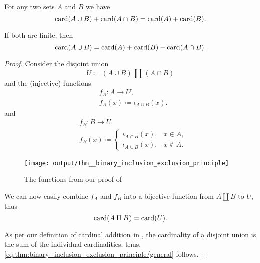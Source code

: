 \begin{theorem}\label{thm:binary_inclusion_exclusion_principle}
  For any two sets \( A \) and \( B \) we have
  \begin{equation}\label{eq:thm:binary_inclusion_exclusion_principle/general}
    \operatorname{card}(A \cup B) + \operatorname{card}(A \cap B) = \operatorname{card}(A) + \operatorname{card}(B).
  \end{equation}

  If both are finite, then
  \begin{equation}\label{eq:thm:binary_inclusion_exclusion_principle/finite}
    \operatorname{card}(A \cup B) = \operatorname{card}(A) + \operatorname{card}(B) - \operatorname{card}(A \cap B).
  \end{equation}
\end{theorem}
\begin{proof}
  Consider the disjoint union
  \begin{equation*}
    U \coloneqq (A \cup B) \amalg (A \cap B)
  \end{equation*}
  and the (injective) functions
  \begin{equation*}
    \begin{aligned}
      &f_A: A \to U, \\
      &f_A(x) \coloneqq \iota_{A \cup B}(x).
    \end{aligned}
  \end{equation*}
  and
  \begin{equation*}
    \begin{aligned}
      &f_B: B \to U, \\
      &f_B(x) \coloneqq \begin{cases}
        \iota_{A \cap B}(x), &x \in A, \\
        \iota_{A \cup B}(x), &x \not\in A.
      \end{cases}
    \end{aligned}
  \end{equation*}

  \begin{figure}[!ht]
    \centering
    \texttt{[image: output/thm\_\_binary\_inclusion\_exclusion\_principle]}
    \caption{The functions from our proof of }\label{fig:thm:binary_inclusion_exclusion_principle}
  \end{figure}

  We can now easily combine \( f_A \) and \( f_B \) into a bijective function from \( A \amalg B \) to \( U \), thus
  \begin{equation*}
    \operatorname{card}(A \amalg B) = \operatorname{card}(U).
  \end{equation*}

  As per our definition of cardinal addition in , the cardinality of a disjoint union is the sum of the individual cardinalities; thus, \eqref{eq:thm:binary_inclusion_exclusion_principle/general} follows.
\end{proof}

